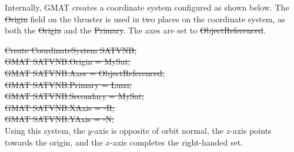 Internally, GMAT creates a coordinate system configured as shown
below.  The \st{Origin} field on the thruster is used in two places
on the coordinate system, as both the \st{Origin} and the
\st{Primary}.  The axes are set to  \st{ObjectReferenced}.

\noindent\st{ Create CoordinateSystem SATVNB;}\\
\st{ GMAT SATVNB.Origin = MySat; }\\
\st{ GMAT SATVNB.Axes = ObjectReferenced;}\\
\st{ GMAT SATVNB.Primary = Luna;}\\
\st{ GMAT SATVNB.Secondary = MySat;}\\
\st{ GMAT SATVNB.XAxis = -R; }\\
\st{ GMAT SATVNB.YAxis = -N; }\\

Using this system, the $y$-axis is opposite of orbit normal, the
$z$-axis points towards the origin, and the $x$-axis completes the
right-handed set.






